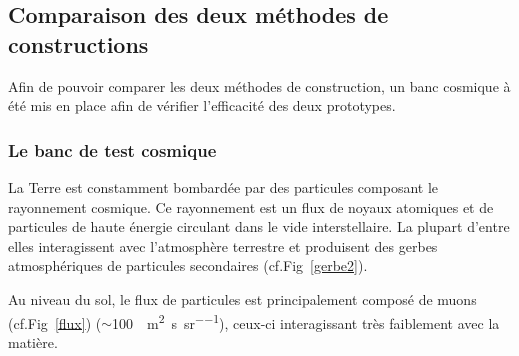  \subsection{Comparaison des deux méthodes de constructions}
 
 Afin de pouvoir comparer les deux méthodes de construction, un banc cosmique à été mis en place afin de vérifier l'efficacité des deux prototypes.
 
 \subsubsection{Le banc de test cosmique}
 \label{banc}
 La Terre est constamment bombardée par des particules composant le rayonnement cosmique. Ce rayonnement est un flux de noyaux atomiques et de particules de haute énergie circulant dans le vide interstellaire. La plupart d'entre elles interagissent avec l'atmosphère terrestre et produisent des gerbes atmosphériques de particules secondaires (cf.Fig~\ref{gerbe2}).
 
 Au niveau du sol, le flux de particules est principalement composé de muons (cf.Fig~\ref{flux}) ($\sim$\SI{100}{\per\square\meter\per\second\per\steradian}), ceux-ci interagissant très faiblement avec la matière.
 
